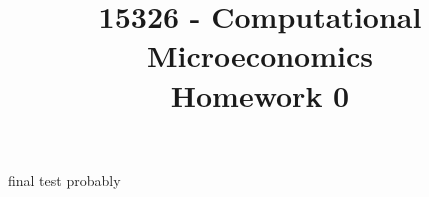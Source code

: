 \documentclass{article}
\title{15326 - Computational Microeconomics\\
Homework 0}
\begin{document}
final test probably
\end{document}
